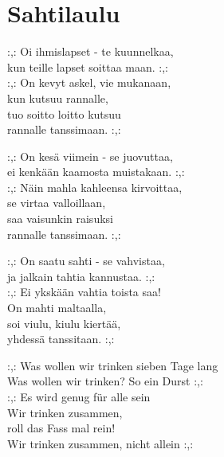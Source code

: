 \section{Sahtilaulu}
:,: Oi ihmislapset - te kuunnelkaa,\\
kun teille lapset soittaa maan. :,:\\
:,: On kevyt askel, vie mukanaan,\\
kun kutsuu rannalle,\\
tuo soitto loitto kutsuu \\
rannalle tanssimaan. :,:

:,: On kesä viimein - se juovuttaa,\\
ei kenkään kaamosta muistakaan. :,:\\
:,: Näin mahla kahleensa kirvoittaa,\\
se virtaa valloillaan,\\
saa vaisunkin raisuksi \\
rannalle tanssimaan. :,:

:,: On saatu sahti - se vahvistaa,\\
ja jalkain tahtia kannustaa. :,:\\
:,: Ei ykskään vahtia toista saa!\\
On mahti maltaalla,\\
soi viulu, kiulu kiertää, \\
yhdessä tanssitaan. :,:

:,: Was wollen wir trinken sieben Tage lang\\
Was wollen wir trinken? So ein Durst :,:\\
:,: Es wird genug für alle sein\\
Wir trinken zusammen, \\
roll das Fass mal rein!\\
Wir trinken zusammen, nicht allein :,: